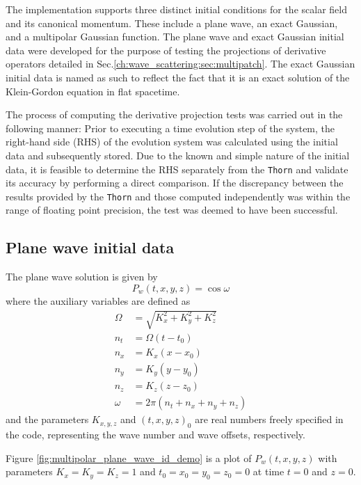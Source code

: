The implementation supports three distinct initial conditions for the scalar field and its canonical momentum. These include a plane wave, an exact Gaussian, and a multipolar Gaussian function. The plane wave and exact Gaussian initial data were developed for the purpose of testing the projections of derivative operators detailed in Sec.\ref{ch:wave_scattering:sec:multipatch}. The exact Gaussian initial data is named as such to reflect the fact that it is an exact solution of the Klein-Gordon equation in flat spacetime.

The process of computing the derivative projection tests was carried out in the following manner: Prior to executing a time evolution step of the system, the right-hand side (RHS) of the evolution system was calculated using the initial data and subsequently stored. Due to the known and simple nature of the initial data, it is feasible to determine the RHS separately from the \texttt{Thorn} and validate its accuracy by performing a direct comparison. If the discrepancy between the results provided by the \texttt{Thorn} and those computed independently was within the range of floating point precision, the test was deemed to have been successful.

\subsection{Plane wave initial data}

The plane wave solution is given by
%
\begin{equation}
  P_w(t,x,y,z) = \cos\omega
\end{equation}
%
where the auxiliary variables are defined as
\begin{align}
  \Omega & = \sqrt{K_x^2 + K_y^2 + K_z^2}               \\
  n_t    & = \Omega (t - t_0)                           \\
  n_x    & = K_x (x - x_0)                              \\
  n_y    & = K_y (y - y_0)                              \\
  n_z    & = K_z (z - z_0)                              \\
  \omega & = 2 \pi \left( n_t + n_x + n_y + n_z \right)
\end{align}
%
and the parameters $K_{x,y,z}$ and $(t,x,y,z)_0$ are real numbers freely specified in the code, representing the wave number and wave offsets, respectively.

Figure \ref{fig:multipolar_plane_wave_id_demo} is a plot of $P_w(t,x,y,z)$ with parameters $K_x = K_y = K_z = 1$ and $t_0 = x_0 = y_0 = z_0 = 0$ at time $t=0$ and $z=0$.


